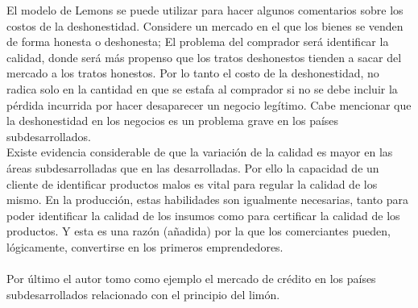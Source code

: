 \begin{multicols}{2}
El modelo de Lemons se puede utilizar para hacer algunos comentarios sobre los costos de la deshonestidad. Considere un mercado en el que los bienes se venden de forma honesta o deshonesta; El problema del comprador será identificar la calidad, donde será más propenso  que los tratos deshonestos tienden a sacar del mercado a los tratos honestos. Por lo tanto  el costo de la deshonestidad, no radica solo en la cantidad en que se estafa al comprador si no se debe incluir la pérdida incurrida por hacer desaparecer un negocio legítimo. Cabe mencionar que la deshonestidad en los negocios es un problema grave en los países subdesarrollados.\\ 
Existe evidencia considerable de que la variación de la calidad es mayor en las áreas subdesarrolladas que en las desarrolladas. Por ello la capacidad de un cliente de identificar productos malos es vital para regular la calidad de los mismo. En la producción, estas habilidades son igualmente necesarias, tanto para poder identificar la calidad de los insumos como para certificar la calidad de los productos. Y esta es una razón (añadida) por la que los comerciantes pueden, lógicamente, convertirse en los primeros emprendedores. \\\\
Por último el autor tomo como ejemplo el mercado de crédito en los países subdesarrollados relacionado con el principio del limón.  


 \end{multicols}
